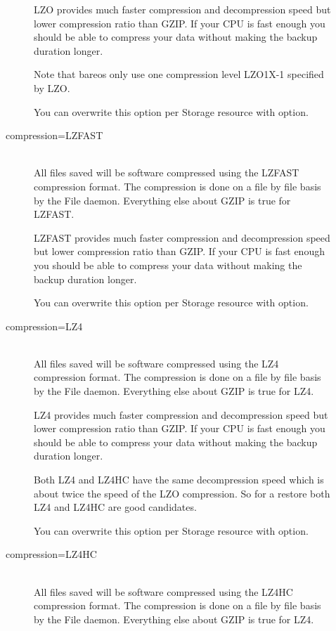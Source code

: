 \begin{description}
\begin{description}
    LZO provides much faster compression and decompression speed but lower
    compression ratio than GZIP. If your CPU is fast enough you should be able
    to compress your data without making the backup duration longer.

    Note that bareos only use one compression level LZO1X-1 specified by LZO.

    You can overwrite this option per Storage resource with
     option.

    \item [compression=LZFAST] \hfill \\
    All files saved will be software compressed using the LZFAST
    compression format. The compression is done on a file by file basis by
    the File daemon. Everything else about GZIP is true for LZFAST.

    LZFAST provides much faster compression and decompression speed but lower
    compression ratio than GZIP. If your CPU is fast enough you should be able
    to compress your data without making the backup duration longer.

    You can overwrite this option per Storage resource with
     option.

    \item [compression=LZ4] \hfill \\
    All files saved will be software compressed using the LZ4
    compression format. The compression is done on a file by file basis by
    the File daemon. Everything else about GZIP is true for LZ4.

    LZ4 provides much faster compression and decompression speed but lower
    compression ratio than GZIP. If your CPU is fast enough you should be able
    to compress your data without making the backup duration longer.

    Both LZ4 and LZ4HC have the same decompression speed which is about twice
    the speed of the LZO compression. So for a restore both LZ4 and LZ4HC are
    good candidates.

    You can overwrite this option per Storage resource with
     option.

    \item [compression=LZ4HC] \hfill \\
    All files saved will be software compressed using the LZ4HC
    compression format. The compression is done on a file by file basis by
    the File daemon. Everything else about GZIP is true for LZ4.


\end{description}
\end{description}
